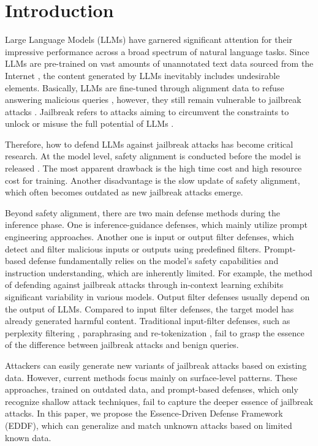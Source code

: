 \section{Introduction}
Large Language Models (LLMs) have garnered significant attention for their impressive performance across a broad spectrum of natural language tasks\citep{minaee2024large}. Since LLMs are pre-trained on vast amounts of unannotated text data sourced from the Internet \citep{alizadeh2025open}, the content generated by LLMs inevitably includes undesirable elements\citep{crothers2023machine}. Basically, LLMs are fine-tuned through alignment data to refuse answering malicious queries \citep{liu2023trustworthy}, however, they still remain vulnerable to jailbreak attacks \citep{yi2024jailbreak}. Jailbreak refers to attacks aiming to circumvent the constraints to unlock or misuse the full potential of LLMs \citep{yu2024don}. 

Therefore, how to defend LLMs against jailbreak attacks has become critical research. At the model level, safety alignment is conducted before the model is released \citep{zhou2024emulated}. The most apparent drawback is the high time cost and high resource cost for training. Another disadvantage is the slow update of safety alignment, which often becomes outdated as new jailbreak attacks emerge.

Beyond safety alignment, there are two main defense methods during the inference phase. One is inference-guidance defenses, which mainly utilize prompt engineering approaches. Another one is input or output filter defenses, which detect and filter malicious inputs or outputs using predefined filters. Prompt-based defense fundamentally relies on the model's safety capabilities and instruction understanding, which are inherently limited. For example, the method of defending against jailbreak attacks through in-context learning \citep{zhou2024defending} exhibits significant variability in various models. Output filter defenses usually depend on the output of LLMs. Compared to input filter defenses, the target model has already generated harmful content. Traditional input-filter defenses, such as perplexity filtering \citep{alon2023detecting}, paraphrasing \citep{jain2023baseline} and re-tokenization \citep{cao2023defending}, fail to grasp the essence of the difference between jailbreak attacks and benign queries.

Attackers can easily generate new variants of jailbreak attacks based on existing data. However, current methods focus mainly on surface-level patterns. These approaches, trained on outdated data, and prompt-based defenses, which only recognize shallow attack techniques, fail to capture the deeper essence of jailbreak attacks. In this paper, we propose the Essence-Driven Defense Framework (EDDF), which can generalize and match unknown attacks based on limited known data.

